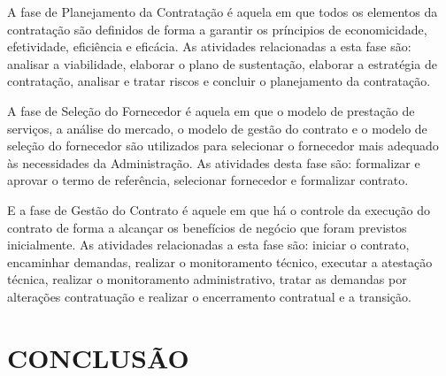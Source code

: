 A fase de Planejamento da Contratação é aquela em que todos os elementos da contratação são definidos de forma a garantir os príncipios de economicidade, efetividade, eficiência e eficácia.  As atividades relacionadas a esta fase são: analisar a viabilidade, elaborar o plano de sustentação, elaborar a estratégia de contratação, analisar e tratar riscos e concluir o planejamento da contratação.

A fase de Seleção do Fornecedor é aquela em que o modelo de prestação de serviços, a análise do mercado, o modelo de gestão do contrato e o modelo de seleção do fornecedor são utilizados para selecionar o fornecedor mais adequado às necessidades da Administração. As atividades desta fase são: formalizar e aprovar o termo de referência, selecionar fornecedor e formalizar contrato.

E a fase de Gestão do Contrato é aquele em que há o controle da execução do contrato de forma a alcançar os benefícios de negócio que foram previstos inicialmente.  As atividades relacionadas a esta fase são: iniciar o contrato, encaminhar demandas, realizar o monitoramento técnico, executar a atestação técnica, realizar o monitoramento administrativo, tratar as demandas por alterações contratuação e realizar o encerramento contratual e a transição.

\section[Conclusão]{CONCLUSÃO}

